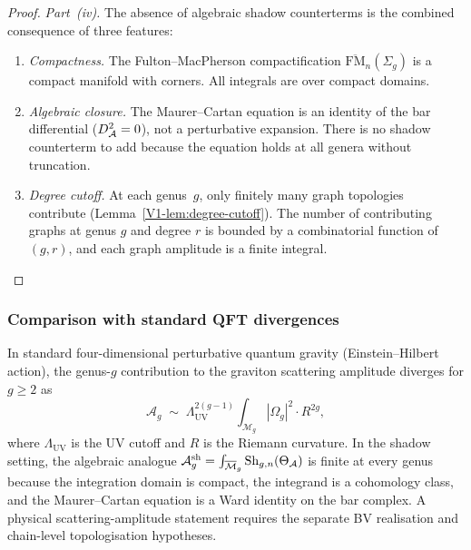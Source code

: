 \begin{proof}
\emph{Part~(iv).} The absence of algebraic shadow counterterms is the combined consequence of three features:
\begin{enumerate}[label=\textup{(\alph*)}]
\item \emph{Compactness.} The Fulton--MacPherson compactification $\overline{\mathrm{FM}}_n(\Sigma_g)$ is a compact manifold with corners. All integrals are over compact domains.
\item \emph{Algebraic closure.} The Maurer--Cartan equation is an identity of the bar differential ($D_{\mathcal{A}}^2 = 0$), not a perturbative expansion. There is no shadow counterterm to add because the equation holds at all genera without truncation.
\item \emph{Degree cutoff.} At each genus~$g$, only finitely many graph topologies contribute (Lemma~\ref{V1-lem:degree-cutoff}). The number of contributing graphs at genus $g$ and degree $r$ is bounded by a combinatorial function of $(g,r)$, and each graph amplitude is a finite integral.
\end{enumerate}
\end{proof}

\subsubsection{Comparison with standard QFT divergences}

\begin{remark}[Contrast with perturbative quantum gravity in $d = 4$]
In standard four-dimensional perturbative quantum gravity (Einstein--Hilbert action), the genus-$g$ contribution to the graviton scattering amplitude diverges for $g \geq 2$ as
\begin{equation}%
\mathcal{A}_g \;\sim\; \Lambda_{\mathrm{UV}}^{2(g-1)} \int_{\mathcal{M}_g} |\Omega_g|^2 \cdot R^{2g},
\end{equation}
where $\Lambda_{\mathrm{UV}}$ is the UV cutoff and $R$ is the Riemann curvature. In the shadow setting, the algebraic analogue $\mathcal{A}_g^{\mathrm{sh}} = \int_{\overline{\mathcal{M}}_g} \operatorname{Sh}_{g,n}(\Theta_{\mathcal{A}})$ is finite at every genus because the integration domain is compact, the integrand is a cohomology class, and the Maurer--Cartan equation is a Ward identity on the bar complex. A physical scattering-amplitude statement requires the separate BV realisation and chain-level topologisation hypotheses.
\end{remark}

